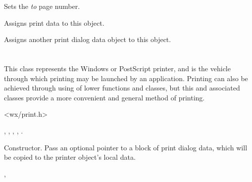 \label{wxprintdialogdatasettopage}


Sets the {\it to} page number.

\label{wxprintdialogdataassign}


Assigns print data to this object.


Assigns another print dialog data object to this object.

\section{}\label{wxprinter}

This class represents the Windows or PostScript printer, and is the vehicle through
which printing may be launched by an application. Printing can also
be achieved through using of lower functions and classes, but
this and associated classes provide a more convenient and general
method of printing.




<wx/print.h>


, , ,\rtfsp
{}, .




Constructor. Pass an optional pointer to a block of print
dialog data, which will be copied to the printer object's local data.


,


